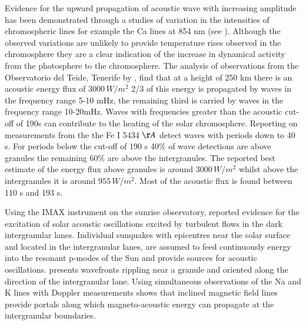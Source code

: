 \documentclass[authoryear,final,1p]{elsarticle}
\begin{document}
Evidence for the upward propagation of acoustic wave with increasing amplitude has been demonstrated through a studies of 
variation in the intensities of chromospheric lines for example the Ca lines at 854 nm (see  \citet{Beck2012}). Although the 
observed variations are unlikely to provide temperature rises observed in the chromosphere they are a clear indication of the increase in dynamical activity from the photosphere to the chromosphere. The analysis of observations from the Observatorio del Teide, Tenerife by  \citet{Bello2009}, find that at a height of 250 km there is an acoustic energy flux of $3000 \,W/m^2$  2/3 of this energy is propagated by waves in the frequency range 5-10 mHz, the remaining third is carried by waves in the frequency range 10-20mHz. Waves with frequencies greater than the acoustic cut-off of 190s can contribute to the heating of the solar chromosphere. Reporting on measurements from the the Fe I 5434 ${\AA}$ \citet{Bello2010A} detect waves with periods down to 40 s. For periods below the cut-off of 190 s 40\% of wave detections are above granules the remaining 60\% are above the intergranules. The reported best estimate of the energy flux above granules is around $3000 \, W/m^2$ whilst above the intergranules it is around $955 \, W/m^2$. Most of the acoustic flux is found between 110 s and 193 s.

Using the IMAX instrument on the sunrise observatory, \citet{Roth2010}  reported evidence for the excitation of solar acoustic oscillations excited by turbulent flows  in the dark intergranular lanes.  Individual sunquakes with epicentres near the solar surface and located in the intergranular lanes, are assumed to feed continuously energy into the resonant p-modes of the Sun and provide sources for acoustic oscillations. \citet{Roth2010} presents wavefronts rippling near a granule and oriented along the direction of the intergranular lane. Using simultaneous observations of the Na and K lines with Doppler measurements  \citet{Jefferies2006} shows that inclined magnetic field lines provide portals along which magneto-acoustic energy can propagate at the intergranular boundaries.
\end{document}
